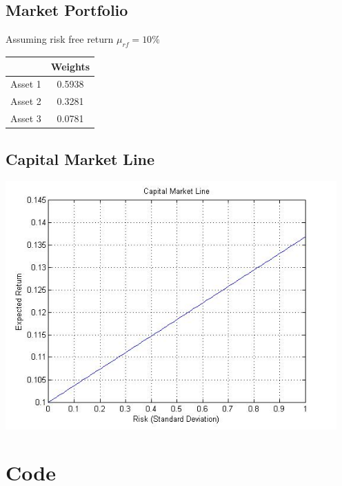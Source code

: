 \documentclass[12pt]{article}
\begin{document}
  
  \subsection*{Market Portfolio}
  Assuming risk free return $\mu_{rf} = 10\%$
  \begin{center}
  \begin{tabular}{c|c}
    &Weights \\ \hline \hline
  Asset 1   &0.5938        \\ \hline
  Asset 2   &0.3281\\ \hline
  Asset 3   &0.0781 \\ \hline
  \end{tabular}
  \end{center}
  
  \subsection*{Capital Market Line}
  \begin{center}
    \includegraphics[width=5in]{capmarkline.jpg}
  \end{center}

\newpage
\section{Code}
  
\end{document}
